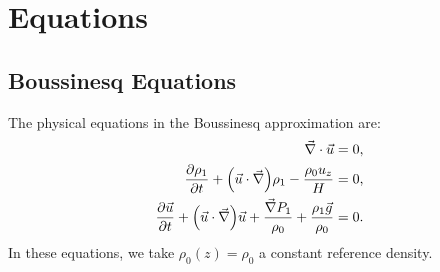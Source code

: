 \documentclass[11pt,
        usenames, %
        dvipsnames %
    ]{article}
\newcommand*{\pd}[2]{\frac{\partial#1}{\partial#2}}
\DeclarePairedDelimiter\p{\lparen}{\rparen}
\begin{document}
\def\Snospace~{\S{}} %
\renewcommand*{\sectionautorefname}{\Snospace}
\renewcommand*{\appendixautorefname}{\Snospace}
\renewcommand*{\figureautorefname}{Fig.}
\renewcommand*{\equationautorefname}{Eq.}
\renewcommand*{\tableautorefname}{Tab.}

\onehalfspacing

\pagestyle{fancy}
\rhead{}
\cfoot{\thepage/\pageref{LastPage}}

\section{Equations}

\subsection{Boussinesq Equations}

The physical equations in the Boussinesq approximation are:
\begin{subequations}\label{se:bouss}
    \begin{align}
        \vec{\nabla} \cdot \vec{u} &= 0,\\
        \pd{\rho_1}{t} + \p*{\vec{u} \cdot \vec{\nabla}}\rho_1
            - \frac{\rho_0 u_z}{H} &= 0,\\
        \pd{\vec{u}}{t} + \p*{\vec{u} \cdot \vec{\nabla}}\vec{u}
            + \frac{\vec{\nabla}P_1}{\rho_0}
            + \frac{\rho_1 \vec{g}}{\rho_0} &= 0.
    \end{align}
\end{subequations}
In these equations, we take $\rho_0(z) = \rho_0$ a constant reference density.
\end{document}
